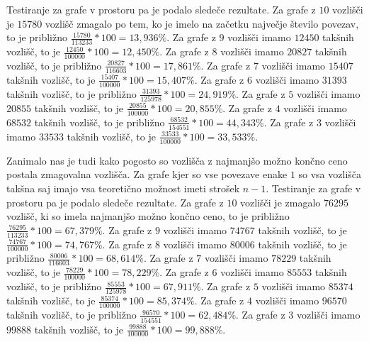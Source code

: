 \documentclass[fin1, tisk]{fmfdelo}
\begin{document}
Testiranje za grafe v prostoru pa je podalo sledeče rezultate.
Za grafe z $10$ vozlišči je $15780$ vozlišč zmagalo po tem, ko je imelo na začetku največje število povezav, to je približno $\frac{15780}{113233}*100 = 13,936 \%$.
Za grafe z $9$ vozlišči imamo $12450$ takšnih vozlišč, to je $\frac{12450}{100000}*100 = 12,450 \%$.
Za grafe z $8$ vozlišči imamo $20827$ takšnih vozlišč, to je približno $\frac{20827}{116603}*100 = 17,861 \%$.
Za grafe z $7$ vozlišči imamo $15407$ takšnih vozlišč, to je $\frac{15407}{100000}*100 = 15,407 \%$.
Za grafe z $6$ vozlišči imamo $31393$ takšnih vozlišč, to je približno $\frac{31393}{125978}*100 = 24,919 \%$.
Za grafe z $5$ vozlišči imamo $20855$ takšnih vozlišč, to je $\frac{20855}{100000}*100 = 20,855 \%$.
Za grafe z $4$ vozlišči imamo $68532$ takšnih vozlišč, to je približno $\frac{68532}{154551}*100 = 44,343 \%$.
Za grafe z $3$ vozlišči imamo $33533$ takšnih vozlišč, to je $\frac{33533}{100000}*100 = 33,533 \%$.





Zanimalo nas je tudi kako pogosto so vozlišča z najmanjšo možno končno ceno postala zmagovalna vozlišča.
Za grafe kjer so vse povezave enake $1$ so vsa vozlišča takšna saj imajo vsa teoretično možnost imeti strošek $n-1$.
Testiranje za grafe v prostoru pa je podalo sledeče rezultate.
Za grafe z $10$ vozlišči je zmagalo $76295$ vozlišč, ki so imela najmanjšo možno končno ceno, to je približno $\frac{76295}{113233}*100 = 67,379 \%$.
Za grafe z $9$ vozlišči imamo $74767$ takšnih vozlišč, to je $\frac{74767}{100000}*100 = 74,767 \%$.
Za grafe z $8$ vozlišči imamo $80006$ takšnih vozlišč, to je približno $\frac{80006}{116603}*100 = 68,614 \%$.
Za grafe z $7$ vozlišči imamo $78229$ takšnih vozlišč, to je $\frac{78229}{100000}*100 = 78,229 \%$.
Za grafe z $6$ vozlišči imamo $85553$ takšnih vozlišč, to je približno $\frac{85553}{125978}*100 = 67,911 \%$.
Za grafe z $5$ vozlišči imamo $85374$ takšnih vozlišč, to je $\frac{85374}{100000}*100 = 85,374 \%$.
Za grafe z $4$ vozlišči imamo $96570$ takšnih vozlišč, to je približno $\frac{96570}{154551}*100 = 62,484 \%$.
Za grafe z $3$ vozlišči imamo $99888$ takšnih vozlišč, to je $\frac{99888}{100000}*100 = 99,888 \%$.
\end{document}
